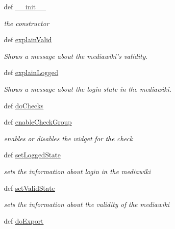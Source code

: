 \begin{DoxyCompactItemize}
\item 
def \hyperlink{classuicilibris_1_1export_1_1Dialog_ac1dde885aed1f2c9a2868aa7c8e9383b}{\-\_\-\-\_\-init\-\_\-\-\_\-}
\begin{DoxyCompactList}\small\item\em the constructor \end{DoxyCompactList}\item 
def \hyperlink{classuicilibris_1_1export_1_1Dialog_a391c0517f2f03997174429d3975b8d77}{explain\-Valid}
\begin{DoxyCompactList}\small\item\em \-Shows a message about the mediawiki's validity. \end{DoxyCompactList}\item 
def \hyperlink{classuicilibris_1_1export_1_1Dialog_abe53096b40cb8fc17a7a1a6bdeb37a9a}{explain\-Logged}
\begin{DoxyCompactList}\small\item\em \-Shows a message about the login state in the mediawiki. \end{DoxyCompactList}\item 
def \hyperlink{classuicilibris_1_1export_1_1Dialog_a4f21b4bdaef4a4895263b8736d96e666}{do\-Checks}
\item 
def \hyperlink{classuicilibris_1_1export_1_1Dialog_a5f3ee8a0cad10e0277f69da100d23223}{enable\-Check\-Group}
\begin{DoxyCompactList}\small\item\em enables or disables the widget for the check \end{DoxyCompactList}\item 
def \hyperlink{classuicilibris_1_1export_1_1Dialog_a70dddfb3f14af29cb206ad1cc28bba66}{set\-Logged\-State}
\begin{DoxyCompactList}\small\item\em sets the information about login in the mediawiki \end{DoxyCompactList}\item 
def \hyperlink{classuicilibris_1_1export_1_1Dialog_a3ece649c3025eca49cacfb0606f35cca}{set\-Valid\-State}
\begin{DoxyCompactList}\small\item\em sets the information about the validity of the mediawiki \end{DoxyCompactList}\item 
def \hyperlink{classuicilibris_1_1export_1_1Dialog_ab464d85df00bb6a8ae5a11f873706889}{do\-Export}
\end{DoxyCompactItemize}
